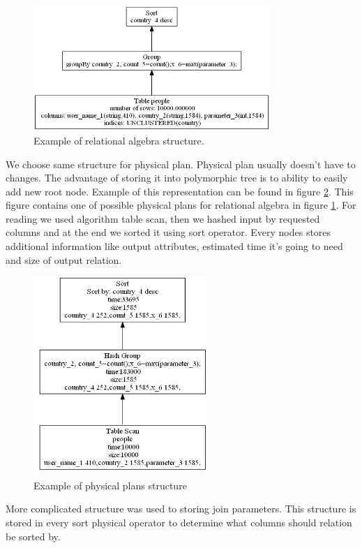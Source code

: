 \begin{figure}[h!]
  \centering
    \includegraphics[width=0.8\textwidth]{groupalgebra}

      \caption{Example of relational algebra structure.}
          \label{fig:groupalgebra}
\end{figure}

We choose same structure for physical plan. Physical plan usually doesn't have to changes. The advantage of storing it into polymorphic tree is to ability to easily add new root node. Example of this representation can be found in figure \ref{fig:groupplan}. This figure contains one of possible physical plans for relational algebra in figure  \ref{fig:groupalgebra}. For reading we used algorithm table scan, then we hashed input by requested columns and at the end we sorted it using sort operator. Every nodes stores additional information like output attributes, estimated time it's going to need and size of output relation.

\begin{figure}[h!]
  \centering
    \includegraphics[width=0.6\textwidth]{groupplan}

      \caption{Example of physical plans structure}
          \label{fig:groupplan}
\end{figure}
More complicated structure was used to storing join parameters. This structure is stored in every sort physical operator to determine what columns should relation be sorted by. 

